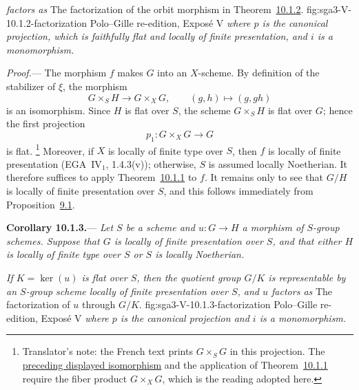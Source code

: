 
\textit{factors as}
  {The factorization of the orbit morphism in
   Theorem~\hyperref[thm:sga3-V-10.1.2]{10.1.2}.}
  {fig:sga3-V-10.1.2-factorization}
  {Polo--Gille re-edition, Expos\'e V}
\textit{where \(p\) is the canonical projection, which is faithfully
flat and locally of finite presentation, and \(i\) is a monomorphism.}

\medskip
\noindent\textit{Proof.}---
The morphism \(f\) makes \(G\) into an \(X\)-scheme. By definition of
the stabilizer of \(\xi\), the morphism
\label{eq:sga3-V-10.1.2-stabilizer-isomorphism}%
\[
  G\times_S H\longrightarrow G\times_XG,
  \qquad (g,h)\longmapsto(g,gh)
\]
is an isomorphism. Since \(H\) is flat over \(S\), the scheme
\(G\times_SH\) is flat over \(G\); hence the first projection
\[
  p_1:G\times_XG\longrightarrow G
\]
is flat.%
\footnote{\label{source-note:sga3-V-10.1.2-fiber-product-base}Translator's note: the French text prints \(G\times_SG\) in this projection.
The \hyperref[eq:sga3-V-10.1.2-stabilizer-isomorphism]{preceding displayed isomorphism} and the application of
Theorem~\hyperref[thm:sga3-V-10.1.1]{10.1.1} require the fiber product \(G\times_XG\), which is the
reading adopted here.}
Moreover, if \(X\) is locally of finite type over \(S\), then \(f\) is
locally of finite presentation (EGA~IV\(_1\), 1.4.3(v)); otherwise,
\(S\) is assumed locally Noetherian. It therefore suffices to apply
Theorem~\hyperref[thm:sga3-V-10.1.1]{10.1.1} to \(f\). It remains only
to see that \(G/H\) is locally of finite presentation over \(S\), and
this follows immediately from
Proposition~\hyperref[sga3:v:proposition:9:1]{9.1}.

\medskip
{}\label{cor:sga3-V-10.1.3}%
\noindent\textbf{Corollary 10.1.3.}---
\textit{Let \(S\) be a scheme and \(u:G\to H\) a morphism of
\(S\)-group schemes. Suppose that \(G\) is locally of finite
presentation over \(S\), and that either \(H\) is locally of finite
type over \(S\) or \(S\) is locally Noetherian.}

\textit{If \(K=\ker(u)\) is flat over \(S\), then the quotient group
\(G/K\) is representable by an \(S\)-group scheme locally of finite
presentation over \(S\), and \(u\) factors as}
  {The factorization of \(u\) through \(G/K\).}
  {fig:sga3-V-10.1.3-factorization}
  {Polo--Gille re-edition, Expos\'e V}
\textit{where \(p\) is the canonical projection and \(i\) is a
monomorphism.}

